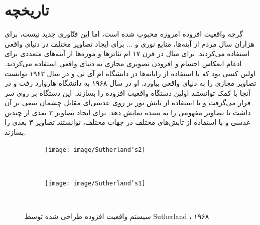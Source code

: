 \section{تاریخچه}
گرچه واقعیت افزوده امروزه محبوب شده است، اما این فنّاوری جدید نیست، برای هزاران سال مردم از آینه‌ها، منابع نوری و ... برای ایجاد تصاویر مختلف در دنیای واقعی استفاده می‌کردند. برای مثال در قرن ۱۷ ام تئاترها و موزه‌ها از آینه‌های متعددی  برای ادغام انعکاس اجسام و افزودن تصویری مجازی به دنیای واقعی استفاده می‌کردند\cite{Brooker}.  اولین کسی بود که با استفاده از رایانه‌ها در دانشگاه ام آی تی  و در سال ۱۹۶۳ توانست تصاویر مجازی را به دنیای واقعی بیاورد\cite{Sutherland}. او در سال ۱۹۶۸ به دانشگاه هاروارد  رفت و در آنجا با کمک  توانستند اولین دستگاه واقعیت افزوده را بسازند\cite{Sutherland2}. این دستگاه بر روی سر قرار می‌گرفت و با استفاده از تابش نور بر روی عدسی‌ای مقابل چشمان سعی بر آن داشت تا تصاویر مفهومی را به بیننده نمایش دهد. برای ایجاد تصاویر ۳ بعدی از چندین عدسی و با استفاده از تابش‌های مختلف در جهات مختلف، توانستند تصاویر ۳ بعدی را بسازند\cite{Sutherland2}.
\\
\begin{figure}
	\centering
	\begin{subfigure}[b]{0.3\textwidth}
		\texttt{[image: image/Sutherland’s2]}
		
		\label{fig:gull}
	\end{subfigure}
	~ %
	\begin{subfigure}[b]{0.6\textwidth}
		\texttt{[image: image/Sutherland’s1]}
		
		\label{fig:tiger}
	\end{subfigure}
	~ %
	
	\caption{سیستم واقعیت افزوده طراحی شده توسط Sutherland ، ۱۹۶۸ \cite{Sutherland2}}\label{fig:Sutherland1968}
\end{figure}

